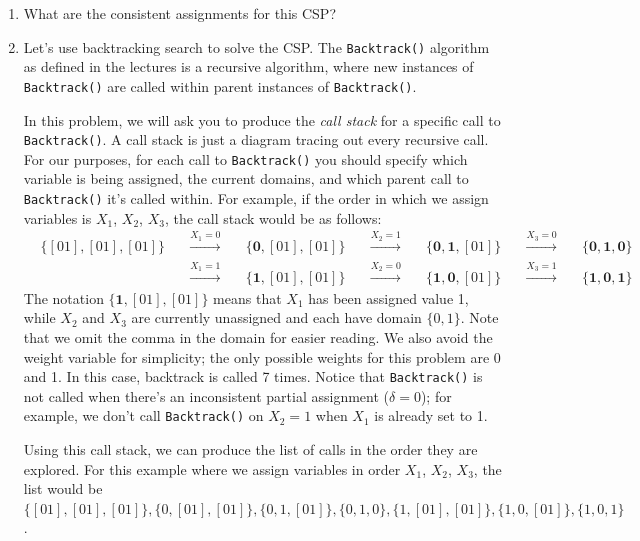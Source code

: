 \documentclass{article}
\theoremstyle{case}
\theoremstyle{definition}
\begin{document}
\begin{enumerate}[label=(\roman*)]
    \item What are the consistent assignments for this CSP?
    \item Let's use backtracking search to solve the CSP. The \texttt{Backtrack()} algorithm as defined in the lectures is a recursive algorithm, where new instances of \texttt{Backtrack()} are called within parent instances of \texttt{Backtrack()}.

    In this problem, we will ask you to produce the \emph{call stack} for a specific call to \texttt{Backtrack()}. A call stack is just a diagram tracing out every recursive call. For our purposes, for each call to \texttt{Backtrack()} you should specify which variable is being assigned, the current domains, and which parent call to \texttt{Backtrack()} it's called within. For example, if the order in which we assign variables is $X_1$, $X_2$, $X_3$, the call stack would be as follows:
    \begin{align*}
    &\{[01], [01], [01]\} \quad &\overset{X_1 = 0}{\longrightarrow} \quad &\{\textbf{0}, [01], [01]\} \quad &\overset{X_2 = 1}{\longrightarrow} \quad &\{\textbf{0}, \textbf{1}, [01]\} \quad &\overset{X_3 = 0}{\longrightarrow} \quad &\{\textbf{0}, \textbf{1}, \textbf{0}\} \\
    & &\overset{X_1 = 1}{\longrightarrow} \quad &\{\textbf{1}, [01], [01]\} \quad &\overset{X_2 = 0}{\longrightarrow} \quad &\{\textbf{1}, \textbf{0}, [01]\} \quad &\overset{X_3 = 1}{\longrightarrow} \quad &\{\textbf{1}, \textbf{0}, \textbf{1}\}
    \end{align*}
    The notation $\{\textbf{1}, [01], [01]\}$ means that $X_1$ has been assigned value 1, while $X_2$ and $X_3$ are currently unassigned and each have domain $\{0,1\}$. Note that we omit the comma in the domain for easier reading. We also avoid the weight variable for simplicity; the only possible weights for this problem are 0 and 1. In this case, backtrack is called 7 times. Notice that \texttt{Backtrack()} is not called when there's an inconsistent partial assignment ($\delta=0$); for example, we don't call \texttt{Backtrack()} on $X_2 = 1$ when $X_1$ is already set to 1.

    Using this call stack, we can produce the list of calls in the order they are explored. For this example where we assign variables in order $X_1$, $X_2$, $X_3$, the list would be
    $\{[01], [01], [01]\}, \{0, [01], [01]\}, \{0, 1, [01]\}, \{0, 1, 0\}, \{1, [01], [01]\}, \{1, 0, [01]\}, \{1, 0, 1\}$.


\end{enumerate}
\end{document}
